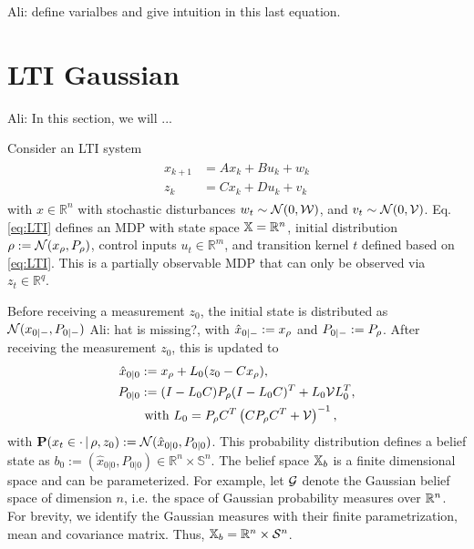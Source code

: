 \documentclass{ifacconf}
\renewcommand{\axx}[1]{{\color{orange} Ali: #1}}
\begin{document}
\axx{define varialbes and give intuition in this last equation.}
 

\section{LTI Gaussian}\label{sec:case}
\axx{In this section, we will ...}

Consider an LTI system
 \begin{align} \label{eq:LTI} \begin{aligned}
x_{k+1}&=A x_{k} + B u_k+ w_k\\
z_k&=Cx_k+Du_k+v_k\end{aligned} \end{align}
with $x\in \mathbb{R}^n$ with stochastic disturbances $w_t\sim \mathcal N(0,\mathcal{W})$, and $v_t\sim \mathcal N(0,\mathcal{V})$. 
Eq. \eqref{eq:LTI}  defines an MDP with state space ${\mathbb{X}}=\mathbb R^n$,  initial distribution  $\rho:=\mathcal N(x_\rho,P_\rho)$,  control inputs $u_t\in\mathbb R^m$, and transition kernel $t$ defined based on  \eqref{eq:LTI}. This is a partially observable MDP that can only be observed via  $z_t\in\mathbb R^q$.
 
 
Before receiving a measurement $z_0$, the initial state is distributed  as $\mathcal{N}(x_{0|-}, P_{0|-})$ \axx{hat is missing?}, with $\hat x_{0|-}:= x_\rho$ and $P_{0|-}:= P_{\rho}$.
After receiving the measurement $z_0$, this is updated to \begin{align*}
	\hat x_{0|0}&:= x_\rho+ L_0 (z_0-Cx_\rho),\\
	P_{0|0}&:=(I-L_0 C) P_{\rho}(I-L_0 C)^T+L_0\mathcal{V} L_0^T,\\
	& \mbox{ with } L_0=P_{\rho}C^T\left(CP_{\rho}C^T+\mathcal V\right)^{-1},
\end{align*}
with $\mathbf{P}(x_t\in \cdot\,|\,\rho,z_0):=\mathcal{N}(\hat x_{0|0}, P_{0|0})$.
This probability distribution defines a belief state as $b_0:=(\hat x_{0|0}, P_{0|0})\in\mathbb R^n\times \mathbb S^n$. The belief space ${{\mathbb{X}}_b}$ is  a finite dimensional space and can be parameterized. For example, let $\mathcal{G}$ denote the Gaussian belief space
    of dimension $n$, i.e. the space of Gaussian
    probability measures over $\mathbb{R}^n$.
    For brevity, we identify the Gaussian measures
    with their finite parametrization, mean and
    covariance matrix.
     Thus,
    ${{\mathbb{X}}_b} =  \mathbb{R}^n \times  \mathcal S^n$.
\end{document}
